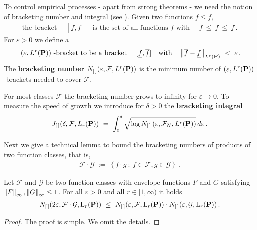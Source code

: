 To control empirical processes - apart from strong theorems - we need the notion of bracketing number and integral (see \cite[page 270]{Vaart2000}). 
Given two functions $\underline{f}\le \overline{f}$,
\begin{gather*}
  \text{
the bracket
  }\quad
[\underline{f},\overline{f}]
\quad 
\text{
is the set of all functions $f$ with 
}\quad 
\underline{f}\ \le\ f \ \le\  \overline{f}
\,.
\end{gather*}
For $\varepsilon>0$
we define a
\begin{gather*}
  \text{
$(\varepsilon, L^{r}(\P))$ -bracket
to be a bracket
  }
  \quad
[\underline{f},\overline{f}]
\quad
\text{with}
\quad
\norm{\overline{f}-\underline{f}}_{ L^r(\P)}
\ <\  \varepsilon
\,.
\end{gather*}
The \textbf{
bracketing number
} 
$
N_{[\,]}(\varepsilon, \mathcal{F}, L^r(\P))
$
is 
the minimum number of 
$(\varepsilon, L^{r}(\P))$-brackets needed to cover $\mathcal{F}$.

For most classes $\mathcal{F}$ the bracketing number grows to infinity for $\varepsilon\to 0$.
To measure the speed of growth we introduce 
for $\delta>0$
the
\textbf{bracketing integral}
\begin{gather*}
     J
    _{[\,]}
    (
    \delta
    ,
    \mathcal{F}
    ,
    L_r(\P)
    )
    \ 
    =
    \ 
  \int_0^{\delta}
      \sqrt{
        \log 
      N_{[\,]}
\left( \varepsilon, \mathcal{F}_N, L^r(\P) \right)
    }
    \,
    d\varepsilon
    \,.
\end{gather*}

Next we give a technical lemma to 
bound the bracketing numbers of products of two function classes, that is,
\begin{gather*}
  \mathcal{F}\cdot \mathcal{G}
  \ 
  :=
  \ 
  \left\{ 
    f\cdot g
    \ 
    \colon
  \ 
    f\in\mathcal{F},
    g\in\mathcal{G}
  \right\}\,.
\end{gather*}
\begin{lemma}
  \label{lem_prod_br}
  Let
  $\mathcal{F}$ and $\mathcal{G}$ be two function classes 
  with envelope functions $F$ and $G$ satisfying
  $\norm{F}_\infty,\norm{G}_\infty\le 1$.
  For all $\varepsilon>0$ and all $r\in [1,\infty)$ it holds
  \begin{gather*}
    N_{[\,]}(2\varepsilon,\mathcal{F}\cdot\mathcal{G},\mathrm{L}_r(\P))
    \
    \le
    \ 
    N_{[\,]}(\varepsilon,\mathcal{F},\mathrm{L}_r(\P))
    \cdot
    N_{[\,]}(\varepsilon,\mathcal{G},\mathrm{L}_r(\P))
    \,.
  \end{gather*}
\end{lemma}
\begin{proof}
  The proof is simple. We omit the details.
\end{proof}

